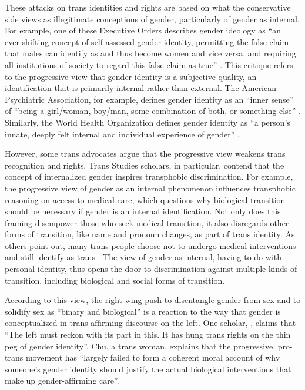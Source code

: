 \documentclass[11pt]{article}
\begin{document}
These attacks on trans identities and rights are based on what the conservative side views as illegitimate conceptions of gender, particularly of gender as internal. For example, one of these Executive Orders describes gender ideology as “an ever-shifting concept of self-assessed gender identity, permitting the false claim that males can identify as and thus become women and vice versa, and requiring all institutions of society to regard this false claim as true” \citep{whitehousea:2025}. This critique refers to the progressive view that gender identity is a subjective quality, an identification that is primarily internal rather than external. The American Psychiatric Association, for example, defines gender identity as an “inner sense” of  “being a girl/woman, boy/man, some combination of both, or something else” \citep{drescher:2025}. Similarly, the World Health Organization defines gender identity as “a person’s innate, deeply felt internal and individual experience of gender” \citep{who:2026}.

However, some trans advocates argue that the progressive view weakens trans recognition and rights. Trans Studies scholars, in particular, contend that the concept of internalized gender inspires transphobic discrimination. For example, the progressive view of gender as an internal phenomenon influences transphobic reasoning on access to medical care, which questions why biological transition should be necessary if gender is an internal identification. Not only does this framing disempower those who seek medical transition, it also disregards other forms of transition, like name and pronoun changes, as part of trans identity. As others point out, many trans people choose not to undergo medical interventions and still identify as trans \citep{kirzinger:2023}. The view of gender as internal, having to do with personal identity, thus opens the door to discrimination against multiple kinds of transition, including biological and social forms of transition.

According to this view, the right-wing push to disentangle gender from sex and to solidify sex as “binary and biological” is a reaction to the way that gender is conceptualized in trans affirming discourse on the left. One scholar, \citet{chu:2024}, claims that “The left must reckon with its part in this. It has hung trans rights on the thin peg of gender identity”. Chu, a trans woman, explains that the progressive, pro-trans movement has “largely failed to form a coherent moral account of why someone’s gender identity should justify the actual biological interventions that make up gender-affirming care”.
\end{document}
